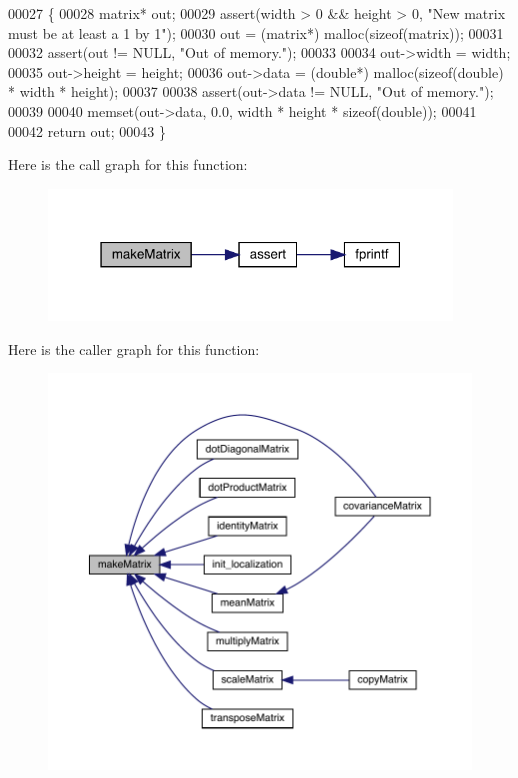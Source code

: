 \begin{DoxyCode}
00027                                           \{
00028     matrix* out;
00029     assert(width > 0 && height > 0, \textcolor{stringliteral}{"New matrix must be at least a 1 by 1"});
00030     out = (matrix*) malloc(\textcolor{keyword}{sizeof}(matrix));
00031 
00032     assert(out != NULL, \textcolor{stringliteral}{"Out of memory."});
00033 
00034     out->width = width;
00035     out->height = height;
00036     out->data = (\textcolor{keywordtype}{double}*) malloc(\textcolor{keyword}{sizeof}(\textcolor{keywordtype}{double}) * width * height);
00037 
00038     assert(out->data != NULL, \textcolor{stringliteral}{"Out of memory."});
00039 
00040     memset(out->data, 0.0, width * height * \textcolor{keyword}{sizeof}(\textcolor{keywordtype}{double}));
00041 
00042     \textcolor{keywordflow}{return} out;
00043 \}
\end{DoxyCode}
Here is the call graph for this function\+:\nopagebreak
\begin{figure}[H]
\begin{center}
\leavevmode
\includegraphics[width=304pt]{matrix_8c_aae8b56c6fb44d9147b835f4006ca872c_cgraph}
\end{center}
\end{figure}
Here is the caller graph for this function\+:\nopagebreak
\begin{figure}[H]
\begin{center}
\leavevmode
\includegraphics[width=350pt]{matrix_8c_aae8b56c6fb44d9147b835f4006ca872c_icgraph}
\end{center}
\end{figure}
\mbox{\label{matrix_8c_ae4babf9b518a2d5d6b12776191e3b7de}} 
